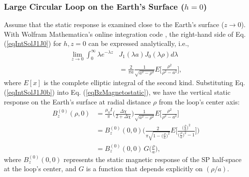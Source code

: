 \documentclass[journal]{IEEEtran}  %
\begin{document}
\subsubsection{Large Circular Loop on the Earth's Surface ($h=0$)}
Assume that the static response is examined close to the Earth's
surface ($z \rightarrow 0$). With Wolfram
Mathematica's online integration code \cite{Wolfram2016}, the
right-hand side of Eq. (\ref{eqIntSolJ1J0}) for $h,z = 0$ can be
expressed analytically, i.e.,
\begin{align}
\lim_{z \rightarrow 0} \int^{\infty}_0 \lambda e^{-\lambda z} &J_1(\lambda a) J_0 (\lambda \rho) d \lambda \nonumber \\
\label{eqIntSolJ1J0b} &= \frac{2 }{\pi a} \frac{1}{\sqrt{a^2-\rho
^2}} E \Bigg [ \frac{\rho^2}{\rho^2 - a^2} \Bigg ],
\end{align}
where $E[x]$ is the complete elliptic integral of the second kind.
Substituting Eq. (\ref{eqIntSolJ1J0b}) into Eq.
(\ref{eqBzMagnetostatic}), we have the vertical static response on
the Earth's surface at radial distance $\rho$ from the loop's center
axis:
\begin{equation}
\begin{split}
B^{(0)}_z(\rho,0) &= \frac{\mu_0 I}{\pi} \Bigg ( \frac{\Delta \chi}{2+\Delta \chi} \Bigg )
 \frac{1}{\sqrt{a^2 -\rho^2}} E \Bigg [ \frac{ \rho^2}{\rho^2 - a^2} \Bigg ] \\
&= B^{(0)}_z(0,0) \Bigg ( \frac{2 }{\pi \sqrt{1 -\big ( \frac{\rho}{a}
\big )^2}} E \Bigg [ \frac{ \big (\frac{\rho}{a} \big )^2}{\big
(\frac{\rho}{a} \big )^2 - 1} \Bigg ] \Bigg )
\\
&= B_z^{(0)}(0,0) \, G \Big (\frac{\rho}{a} \Big ),
\end{split}
\label{eqIntSolJ1J0a3}
\end{equation}
where $B^{(0)}_z (0, 0)$  represents the static magnetic
response of the SP half-space at the loop's center, and $G$ is a
function that depends explicitly on $(\rho /a)$.
\\
\end{document}
